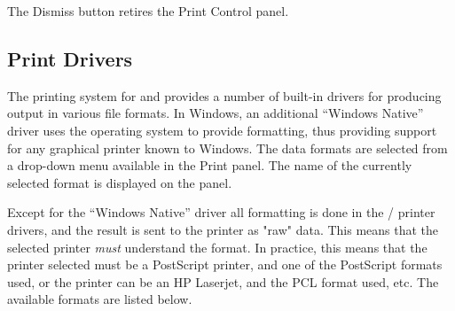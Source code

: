 The {\cb Dismiss} button retires the Print Control panel.

\subsection{Print Drivers}
\label{printdrivers}


The printing system for {\Xic} and {\WRspice} provides a number of
built-in drivers for producing output in various file formats.  In
Windows, an additional ``Windows Native'' driver uses the operating
system to provide formatting, thus providing support for any graphical
printer known to Windows.  The data formats are selected from a
drop-down menu available in the {\cb Print} panel.  The name of the
currently selected format is displayed on the panel.

Except for the ``Windows Native'' driver all formatting is done in the
{\Xic}/{\WRspice} printer drivers, and the result is sent to the
printer as "raw" data.  This means that the selected printer {\it
must} understand the format.  In practice, this means that the printer
selected must be a PostScript printer, and one of the PostScript
formats used, or the printer can be an HP Laserjet, and the PCL format
used, etc.  The available formats are listed below.

